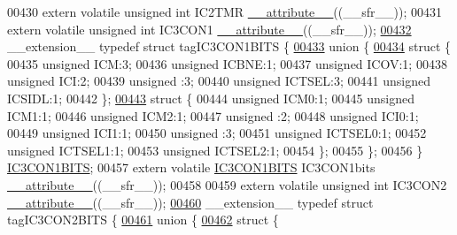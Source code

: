 \begin{DoxyCode}
00430 \textcolor{keyword}{extern} \textcolor{keyword}{volatile} \textcolor{keywordtype}{unsigned} \textcolor{keywordtype}{int}  IC2TMR \hyperlink{a00015_a493c46f03454991ccc5aa7a6e1dfb2a7}{\_\_attribute\_\_}((\_\_sfr\_\_));
00431 \textcolor{keyword}{extern} \textcolor{keyword}{volatile} \textcolor{keywordtype}{unsigned} \textcolor{keywordtype}{int}  IC3CON1 \hyperlink{a00015_a493c46f03454991ccc5aa7a6e1dfb2a7}{\_\_attribute\_\_}((\_\_sfr\_\_));
\hypertarget{a00015_source_l00432}{}\hyperlink{a00014}{00432} \_\_extension\_\_ \textcolor{keyword}{typedef} \textcolor{keyword}{struct }tagIC3CON1BITS \{
\hypertarget{a00015_source_l00433}{}\hyperlink{a00015}{00433}   \textcolor{keyword}{union }\{
\hypertarget{a00015_source_l00434}{}\hyperlink{a00015}{00434}     \textcolor{keyword}{struct }\{
00435       \textcolor{keywordtype}{unsigned} ICM:3;
00436       \textcolor{keywordtype}{unsigned} ICBNE:1;
00437       \textcolor{keywordtype}{unsigned} ICOV:1;
00438       \textcolor{keywordtype}{unsigned} ICI:2;
00439       \textcolor{keywordtype}{unsigned} :3;
00440       \textcolor{keywordtype}{unsigned} ICTSEL:3;
00441       \textcolor{keywordtype}{unsigned} ICSIDL:1;
00442     \};
\hypertarget{a00015_source_l00443}{}\hyperlink{a00015}{00443}     \textcolor{keyword}{struct }\{
00444       \textcolor{keywordtype}{unsigned} ICM0:1;
00445       \textcolor{keywordtype}{unsigned} ICM1:1;
00446       \textcolor{keywordtype}{unsigned} ICM2:1;
00447       \textcolor{keywordtype}{unsigned} :2;
00448       \textcolor{keywordtype}{unsigned} ICI0:1;
00449       \textcolor{keywordtype}{unsigned} ICI1:1;
00450       \textcolor{keywordtype}{unsigned} :3;
00451       \textcolor{keywordtype}{unsigned} ICTSEL0:1;
00452       \textcolor{keywordtype}{unsigned} ICTSEL1:1;
00453       \textcolor{keywordtype}{unsigned} ICTSEL2:1;
00454     \};
00455   \};
00456 \} \hyperlink{a00014_dc/d8e/a00473}{IC3CON1BITS};
00457 \textcolor{keyword}{extern} \textcolor{keyword}{volatile} \hyperlink{a00014_dc/d8e/a00473}{IC3CON1BITS} IC3CON1bits \hyperlink{a00015_a493c46f03454991ccc5aa7a6e1dfb2a7}{\_\_attribute\_\_}((\_\_sfr\_\_));
00458 
00459 \textcolor{keyword}{extern} \textcolor{keyword}{volatile} \textcolor{keywordtype}{unsigned} \textcolor{keywordtype}{int}  IC3CON2 \hyperlink{a00015_a493c46f03454991ccc5aa7a6e1dfb2a7}{\_\_attribute\_\_}((\_\_sfr\_\_));
\hypertarget{a00015_source_l00460}{}\hyperlink{a00014}{00460} \_\_extension\_\_ \textcolor{keyword}{typedef} \textcolor{keyword}{struct }tagIC3CON2BITS \{
\hypertarget{a00015_source_l00461}{}\hyperlink{a00015}{00461}   \textcolor{keyword}{union }\{
\hypertarget{a00015_source_l00462}{}\hyperlink{a00015}{00462}     \textcolor{keyword}{struct }\{

\end{DoxyCode}
